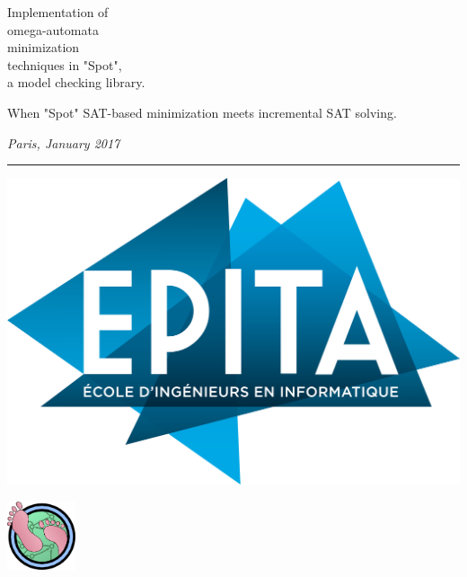\begin{titlepage}
\noindent \titlefont Implementation of \\
omega-automata \\
minimization \\
techniques in "Spot", \\
a model checking library.\par
\epigraph{When "Spot" SAT-based minimization meets incremental SAT solving.}%
{\textit{Paris, January 2017}}
\null\vfill
\vspace*{1cm}
\noindent
\hfill%
%
\noindent\begin{minipage}{0.7\textwidth}
    \begin{flushright}
        \printauthor
    \end{flushright}
\end{minipage}%
%
\begin{minipage}{0.1\linewidth}%
  \hspace{0.5cm}%
  \rule{5pt}{200pt}%
\end{minipage}%
%
\begin{minipage}{0.3\textwidth}%
  \includegraphics[width=\linewidth]{./img/epita.png} \\%
  \begin{center}%
    \includegraphics[width=2cm]{./img/spot.png}%
  \end{center}%

\end{minipage}
\end{titlepage}
